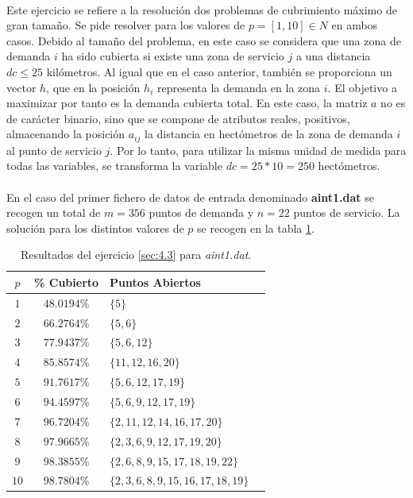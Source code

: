 \documentclass[spanish]{article}
\begin{document}
			\paragraph{}
			Este ejercicio se refiere a la resolución dos problemas de cubrimiento máximo de gran tamaño. Se pide resolver para los valores de $p = [1, 10] \in N$ en ambos casos. Debido al tamaño del problema, en este caso se considera que una zona de demanda $i$ ha sido cubierta si existe una zona de servicio $j$ a una distancia $dc \leq 25$ kilómetros. Al igual que en el caso anterior, también se proporciona un vector $h$, que en la posición $h_i$ representa la demanda en la zona $i$. El objetivo a maximizar por tanto es la demanda cubierta total. En este caso, la matriz $a$ no es de carácter binario, sino que se compone de atributos reales, positivos, almacenando la posición $a_{ij}$ la distancia en hectómetros de la zona de demanda $i$ al punto de servicio $j$. Por lo tanto, para utilizar la misma unidad de medida para todas las variables, se transforma la variable $dc = 25 * 10 = 250$ hectómetros.

			\paragraph{}
			En el caso del primer fichero de datos de entrada denominado \textbf{aint1.dat} se recogen un total de $m = 356$ puntos de demanda y $n=22$ puntos de servicio. La solución para los distintos valores de $p$ se recogen en la tabla \ref{table:sol-4.3a}.

			\begin{table}[h]
				\begin{center}
					\begin{tabular}{|c || c || l || c | }
						\hline
						$p$		&	\% Cubierto	& Puntos Abiertos 						 	\\ \hline \hline
						$1$ 	& $48.0194\%$ & $\{5\}$ 											\\ \hline
						$2$ 	& $66.2764\%$ & $\{5,6\}$ 										\\ \hline
						$3$ 	& $77.9437\%$ & $\{5,6,12\}$ 									\\ \hline
						$4$ 	& $85.8574\%$ & $\{11,12,16,20\}$ 						\\ \hline
						$5$ 	& $91.7617\%$ & $\{5,6,12,17,19\}$ 						\\ \hline
						$6$ 	& $94.4597\%$ & $\{5,6,9,12,17,19\}$ 					\\ \hline
						$7$ 	& $96.7204\%$ & $\{2,11,12,14,16,17,20\}$ 		\\ \hline
						$8$ 	& $97.9665\%$ & $\{2,3,6,9,12,17,19,20\}$ 		\\ \hline
						$9$ 	& $98.3855\%$ & $\{2,6,8,9,15,17,18,19,22\}$	\\ \hline
						$10$ 	& $98.7804\%$ & $\{2,3,6,8,9,15,16,17,18,19\}$\\
						\hline
					\end{tabular}
				\end{center}
				\caption{Resultados del ejercicio \ref{sec:4.3} para \emph{aint1.dat}.}
				\label{table:sol-4.3a}
			\end{table}
\end{document}
